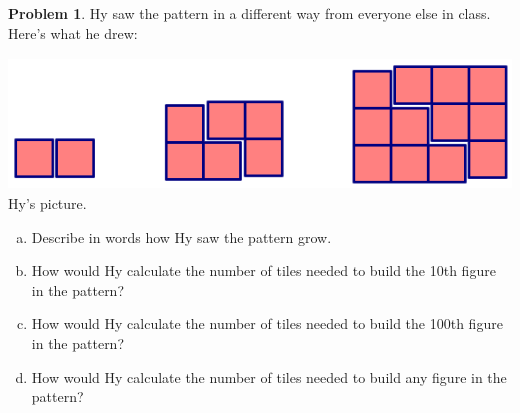 \documentclass[12pt, reqno]{amsart}
\theoremstyle{remark}
\theoremstyle{definition}
\newtheorem{problem}{Problem}
\numberwithin{equation}{section}  %
\begin{document}
\newpage


\begin{problem}
Hy saw the pattern in a different way from everyone else in class.  Here's what he drew:
\begin{center}
\includegraphics[height=3.5cm]{doubledstairs}
Hy's picture.
\end{center}
\begin{enumerate}[(a)]
\item
Describe in words how Hy saw the pattern grow.\\

\item
How would Hy calculate the number of tiles needed to build the 10th figure in the pattern?\\


\item
How would Hy calculate the number of tiles needed to build the 100th figure in the pattern?\\

\item
How would Hy calculate the number of tiles needed to build any figure in the pattern?
\end{enumerate}

\end{problem}

\newpage
\end{document}

